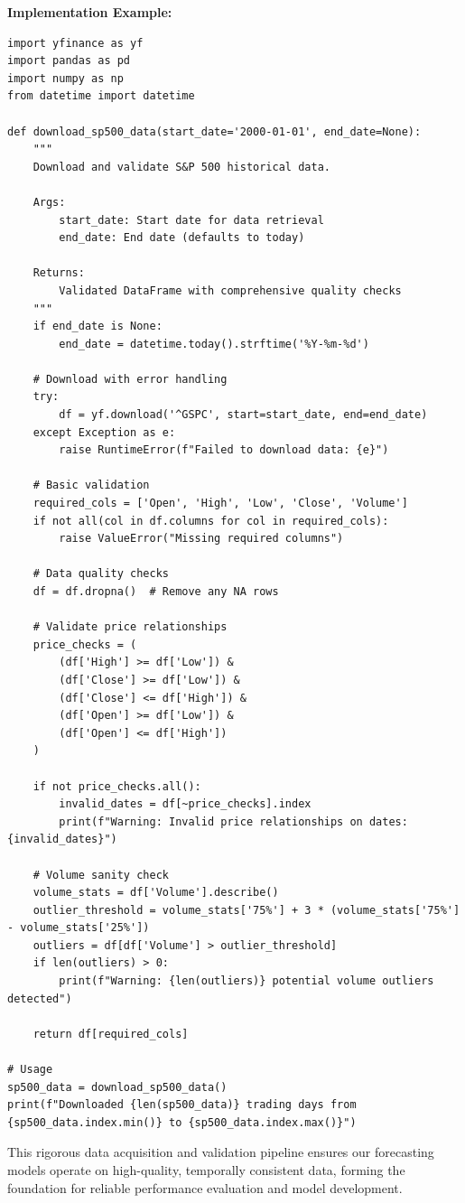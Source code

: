\documentclass[conference]{IEEEtran}
\begin{document}
\textbf{Implementation Example:}
\begin{verbatim}
import yfinance as yf
import pandas as pd
import numpy as np
from datetime import datetime

def download_sp500_data(start_date='2000-01-01', end_date=None):
    """
    Download and validate S&P 500 historical data.

    Args:
        start_date: Start date for data retrieval
        end_date: End date (defaults to today)

    Returns:
        Validated DataFrame with comprehensive quality checks
    """
    if end_date is None:
        end_date = datetime.today().strftime('%Y-%m-%d')

    # Download with error handling
    try:
        df = yf.download('^GSPC', start=start_date, end=end_date)
    except Exception as e:
        raise RuntimeError(f"Failed to download data: {e}")

    # Basic validation
    required_cols = ['Open', 'High', 'Low', 'Close', 'Volume']
    if not all(col in df.columns for col in required_cols):
        raise ValueError("Missing required columns")

    # Data quality checks
    df = df.dropna()  # Remove any NA rows

    # Validate price relationships
    price_checks = (
        (df['High'] >= df['Low']) &
        (df['Close'] >= df['Low']) &
        (df['Close'] <= df['High']) &
        (df['Open'] >= df['Low']) &
        (df['Open'] <= df['High'])
    )

    if not price_checks.all():
        invalid_dates = df[~price_checks].index
        print(f"Warning: Invalid price relationships on dates: {invalid_dates}")

    # Volume sanity check
    volume_stats = df['Volume'].describe()
    outlier_threshold = volume_stats['75%'] + 3 * (volume_stats['75%'] - volume_stats['25%'])
    outliers = df[df['Volume'] > outlier_threshold]
    if len(outliers) > 0:
        print(f"Warning: {len(outliers)} potential volume outliers detected")

    return df[required_cols]

# Usage
sp500_data = download_sp500_data()
print(f"Downloaded {len(sp500_data)} trading days from {sp500_data.index.min()} to {sp500_data.index.max()}")
\end{verbatim}

This rigorous data acquisition and validation pipeline ensures our forecasting models operate on high-quality, temporally consistent data, forming the foundation for reliable performance evaluation and model development.
\end{document}
